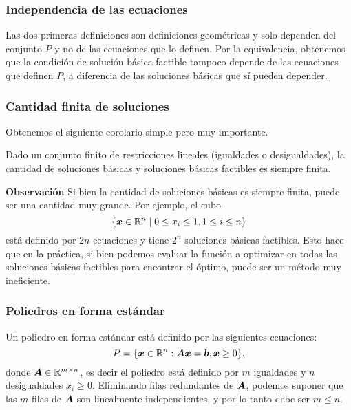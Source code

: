 \documentclass[aspectratio=169,12pt,spanish]{beamer}
\begin{document}

\begin{frame}
\frametitle{Independencia de las ecuaciones}

Las dos primeras definiciones son definiciones geométricas y solo dependen del conjunto $P$ y no de las ecuaciones que lo definen. Por la equivalencia, obtenemos que la condición de solución básica factible tampoco depende de las ecuaciones que definen $P$, a diferencia de las soluciones básicas que sí pueden depender.

\end{frame}


\begin{frame}
\frametitle{Cantidad finita de soluciones}

Obtenemos el siguiente corolario simple pero muy importante.

\begin{corollary}
Dado un conjunto finito de restricciones lineales (igualdades o desigualdades), la cantidad de soluciones básicas y soluciones básicas factibles es siempre finita.
\end{corollary}

\textbf{Observación}
Si bien la cantidad de soluciones básicas es siempre finita, puede ser una cantidad muy grande. Por ejemplo, el cubo
$$
\{\bm{x} \in \mathbb{R}^n \mid 0 \le x_i \le 1, 1 \le i \le n\}
$$
está definido por $2n$ ecuaciones y tiene $2^n$ soluciones básicas factibles.
Esto hace que en la práctica, si bien podemos evaluar la función a optimizar en todas las soluciones básicas factibles para encontrar el óptimo, puede ser un método muy ineficiente.


\end{frame}


\begin{frame}
\frametitle{Poliedros en forma estándar}

Un poliedro en forma estándar está definido por las siguientes ecuaciones:
$$
P = \{\bm{x} \in \mathbb{R}^n : \bm{A}\bm{x} = \bm{b}, \bm{x} \ge 0\},
$$
donde $\bm{A} \in \mathbb{R}^{m \times n}$, es decir el poliedro está definido por $m$ igualdades y $n$ desigualdades $x_i \ge 0$.
Eliminando filas redundantes de $\bm{A}$, podemos suponer que las $m$ filas de $\bm{A}$ son linealmente independientes, y por lo tanto debe ser $m \le n$.

\end{frame}
\end{document}

